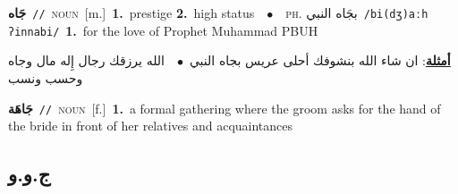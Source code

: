 \documentclass[10pt,a4paper,twoside]{article} %
\begin{document}
\begin{multicols}{2}
{\setlength\topsep{0pt}\textbf{\foreignlanguage{arabic}{جَاه}}\ {\color{gray}\texttt{//}\color{black}}\ \textsc{noun}\ [m.]\ \textbf{1.}~prestige  \textbf{2.}~high status\ \ $\bullet$\ \ \textsc{ph.} \color{gray} \foreignlanguage{arabic}{بجَاه النبي}\color{black}\ {\color{gray}\texttt{/{\sffamily bi(dʒ)aːh ʔinnabi}/}\color{black}}\ \textbf{1.}~for the love of Prophet Muhammad PBUH\  \begin{flushright}\color{gray}\foreignlanguage{arabic}{\textbf{\underline{\foreignlanguage{arabic}{أمثلة}}}: ان شاء الله بنشوفك أحلى عريس بجاه النبي\ $\bullet$\ \  الله يرزقك رجال إِله مال وجاه وحسب ونسب}\end{flushright}\color{black}} \vspace{2mm}

{\setlength\topsep{0pt}\textbf{\foreignlanguage{arabic}{جَاهَة}}\ {\color{gray}\texttt{//}\color{black}}\ \textsc{noun}\ [f.]\ \textbf{1.}~a formal gathering where the groom asks for the hand of the bride in front of her relatives and acquaintances\ } \vspace{2mm}

\vspace{-3mm}
\subsection*{\color{blue}\foreignlanguage{arabic}{ج.و.و}\color{blue}{}} 


\end{multicols}
\end{document}
